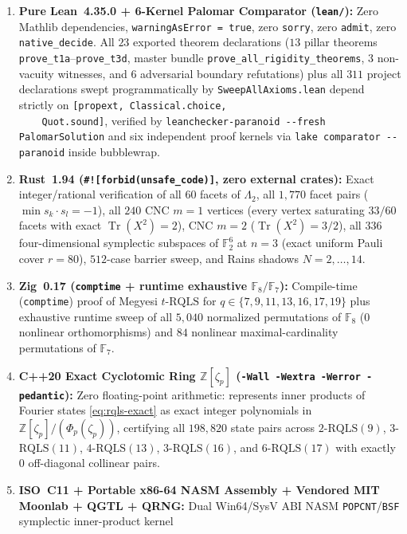 \documentclass[11pt,reqno]{amsart}
\theoremstyle{definition}
\newcommand{\ZZ}{\mathbb{Z}}
\newcommand{\FF}{\mathbb{F}}
\newcommand{\Tr}{\operatorname{Tr}}
\newcommand{\RQLS}{\mathrm{RQLS}}
\newcommand{\lid}[1]{{\footnotesize\nolinkurl{#1}}}
\begin{document}
\begin{enumerate}[label=\textbf{\arabic*.}]
  \item \textbf{Pure Lean~4.35.0 + 6-Kernel Palomar Comparator (\lid{lean/}):}
    Zero Mathlib dependencies, \lid{warningAsError = true}, zero \lid{sorry}, zero
    \lid{admit}, zero \lid{native_decide}. All $23$ exported theorem declarations ($13$
    pillar theorems \lid{prove_t1a}--\lid{prove_t3d}, master bundle
    \lid{prove_all_rigidity_theorems}, $3$ non-vacuity witnesses, and $6$ adversarial
    boundary refutations) plus all $311$ project declarations swept programmatically by
    \lid{SweepAllAxioms.lean} depend strictly on \lid{[propext, Classical.choice,
    Quot.sound]}, verified by \lid{leanchecker-paranoid --fresh PalomarSolution} and six
    independent proof kernels via \lid{lake comparator --paranoid} inside bubblewrap.
  \item \textbf{Rust~1.94 ({\footnotesize\texttt{\#![forbid(unsafe\_code)]}}, zero external crates):}
    Exact integer/rational verification of all $60$ facets of $\Lambda_2$, all
    $1{,}770$ facet pairs ($\min s_k \cdot s_l = -1$), all $240$ CNC $m=1$ vertices
    (every vertex saturating $33/60$ facets with exact $\Tr(X^2) = 2$), CNC $m=2$
    ($\Tr(X^2) = 3/2$), all $336$ four-dimensional symplectic subspaces of $\FF_2^6$ at
    $n=3$ (exact uniform Pauli cover $r = 80$), $512$-case barrier sweep, and Rains
    shadows $N = 2, \dots, 14$.
  \item \textbf{Zig~0.17 (\lid{comptime} + runtime exhaustive $\FF_8/\FF_7$):}
    Compile-time (\lid{comptime}) proof of Megyesi $t$-$\RQLS$ for
    $q \in \{7, 9, 11, 13, 16, 17, 19\}$ plus exhaustive runtime sweep of all $5{,}040$
    normalized permutations of $\FF_8$ ($0$ nonlinear orthomorphisms) and $84$ nonlinear
    maximal-cardinality permutations of $\FF_7$.
  \item \textbf{C++20 Exact Cyclotomic Ring $\ZZ[\zeta_p]$ (\lid{-Wall -Wextra -Werror -pedantic}):}
    Zero floating-point arithmetic: represents inner products of Fourier states
    \eqref{eq:rqls-exact} as exact integer polynomials in $\ZZ[\zeta_p]/(\Phi_p(\zeta_p))$,
    certifying all $198{,}820$ state pairs across $2$-$\RQLS(9)$, $3$-$\RQLS(11)$,
    $4$-$\RQLS(13)$, $3$-$\RQLS(16)$, and $6$-$\RQLS(17)$ with exactly $0$ off-diagonal
    collinear pairs.
  \item \textbf{ISO~C11 + Portable x86-64 NASM Assembly + Vendored MIT Moonlab + QGTL + QRNG:}
    Dual Win64/SysV ABI NASM \lid{POPCNT}/\lid{BSF} symplectic inner-product kernel

\end{enumerate}
\end{document}
